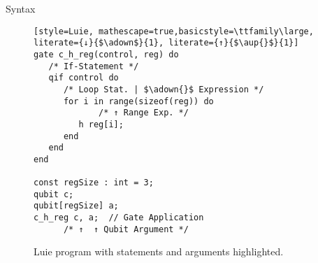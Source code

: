 \begin{frame}[fragile]{Syntax}
\begin{minipage}{.45\textwidth}
    \end{minipage}
    \begin{minipage}{.50\textwidth}
        \begin{figure}[htp]
            \centering     
            \begin{lstlisting}[style=Luie, mathescape=true,basicstyle=\ttfamily\large, literate={↓}{$\adown$}{1}, literate={↑}{$\aup{}$}{1}] 
gate c_h_reg(control, reg) do
   /* If-Statement */
   qif control do
      /* Loop Stat. | $\adown{}$ Expression */
      for i in range(sizeof(reg)) do
             /* ↑ Range Exp. */
         h reg[i];
      end
   end
end

const regSize : int = 3; 
qubit c;
qubit[regSize] a;        
c_h_reg c, a;  // Gate Application  
      /* ↑  ↑ Qubit Argument */                 
            \end{lstlisting}
            \caption{Luie program with statements and arguments highlighted.}
        \end{figure}
    \end{minipage}
\end{frame}

%         


